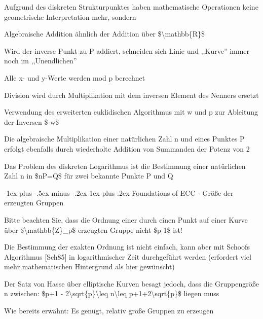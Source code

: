 \documentclass[a4paper]{article}
\makeatletter
\renewcommand{\subsubsection}{\@startsection{subsubsection}{3}{0mm}%
 {-1ex plus -.5ex minus -.2ex}%
 {1ex plus .2ex}%
 {\normalfont\small\bfseries}}
\makeatother
\begin{document}
\begin{multicols}{3}
      \begin{itemize*}
            \item Aufgrund des diskreten Strukturpunktes haben mathematische Operationen
            keine geometrische Interpretation mehr, sondern
            \item Algebraische Addition ähnlich der Addition über
            \$\textbackslash mathbb\{R\}\$
            \item Wird der inverse Punkt zu P addiert, schneiden sich Linie und
            ,,Kurve'' immer noch im ,,Unendlichen''
            \item Alle x- und y-Werte werden mod p berechnet
            \item Division wird durch Multiplikation mit dem inversen Element des
            Nenners ersetzt
            \begin{itemize*}
                  \item Verwendung des erweiterten euklidischen Algorithmus mit w und p zur Ableitung der Inversen \$-w\$
            \end{itemize*}
            \item Die algebraische Multiplikation einer natürlichen Zahl n und eines
            Punktes P erfolgt ebenfalls durch wiederholte Addition von Summanden
            der Potenz von 2
            \item Das Problem des diskreten Logarithmus ist die Bestimmung einer
            natürlichen Zahl n in \$nP=Q\$ für zwei bekannte Punkte P und Q
      \end{itemize*}


      \subsubsection{Foundations of ECC - Größe der erzeugten
            Gruppen}

      \begin{itemize*}
            \item Bitte beachten Sie, dass die Ordnung einer durch einen Punkt auf einer
            Kurve über \$\textbackslash mathbb\{Z\}\_p\$ erzeugten Gruppe nicht
            \$p-1\$ ist!
            \item Die Bestimmung der exakten Ordnung ist nicht einfach, kann aber mit
            Schoofs Algorithmus {[}Sch85{]} in logarithmischer Zeit durchgeführt
            werden (erfordert viel mehr mathematischen Hintergrund als hier
            gewünscht)
            \item Der Satz von Hasse über elliptische Kurven besagt jedoch, dass die
            Gruppengröße n zwischen: \$p+1 -
            2\textbackslash sqrt\{p\}\textbackslash leq n\textbackslash leq
            p+1+2\textbackslash sqrt\{p\}\$ liegen muss
            \item Wie bereits erwähnt: Es genügt, relativ große Gruppen zu erzeugen
      \end{itemize*}



\end{multicols}
\end{document}
